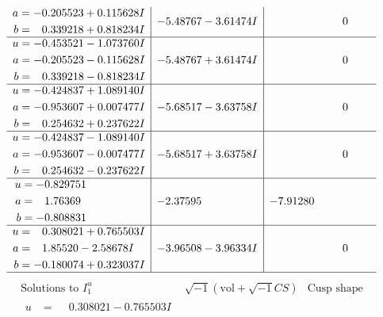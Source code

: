 \documentclass[1p]{elsarticle_modified}
\theoremstyle{definition}
\newcommand{\I}{\sqrt{-1}}
\begin{document}
$$\begin{array}{c|c|c}
\begin{aligned}
a &= -0.205523 + 0.115628 I \\
b &= \phantom{-}0.339218 + 0.818234 I\end{aligned}
 & -5.48767 - 3.61474 I & \phantom{-0.000000 } 0 \\ \hline\begin{aligned}
u &= -0.453521 - 1.073760 I \\
a &= -0.205523 - 0.115628 I \\
b &= \phantom{-}0.339218 - 0.818234 I\end{aligned}
 & -5.48767 + 3.61474 I & \phantom{-0.000000 } 0 \\ \hline\begin{aligned}
u &= -0.424837 + 1.089140 I \\
a &= -0.953607 + 0.007477 I \\
b &= \phantom{-}0.254632 + 0.237622 I\end{aligned}
 & -5.68517 - 3.63758 I & \phantom{-0.000000 } 0 \\ \hline\begin{aligned}
u &= -0.424837 - 1.089140 I \\
a &= -0.953607 - 0.007477 I \\
b &= \phantom{-}0.254632 - 0.237622 I\end{aligned}
 & -5.68517 + 3.63758 I & \phantom{-0.000000 } 0 \\ \hline\begin{aligned}
u &= -0.829751\phantom{ +0.000000I} \\
a &= \phantom{-}1.76369\phantom{ +0.000000I} \\
b &= -0.808831\phantom{ +0.000000I}\end{aligned}
 & -2.37595\phantom{ +0.000000I} & -7.91280\phantom{ +0.000000I} \\ \hline\begin{aligned}
u &= \phantom{-}0.308021 + 0.765503 I \\
a &= \phantom{-}1.85520 - 2.58678 I \\
b &= -0.180074 + 0.323037 I\end{aligned}
 & -3.96508 - 3.96334 I & \phantom{-0.000000 } 0\\
 \hline 
 \end{array}$$\newpage$$\begin{array}{c|c|c}  
\text{Solutions to }I^u_{1}& \I (\text{vol} + \sqrt{-1}CS) & \text{Cusp shape}\\
 \hline 
\begin{aligned}
u &= \phantom{-}0.308021 - 0.765503 I \\

\end{aligned}
\end{array}$$
\end{document}
